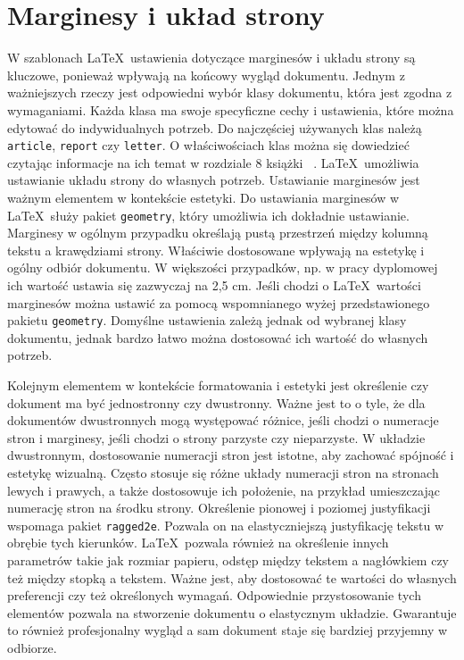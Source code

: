 
\section{Marginesy i układ strony }\label{sec:klassa}
W szablonach \LaTeX\ ustawienia dotyczące marginesów i układu strony są kluczowe, ponieważ wpływają na końcowy wygląd dokumentu. Jednym z ważniejszych rzeczy jest odpowiedni wybór klasy dokumentu, która jest zgodna z wymaganiami. Każda klasa ma swoje specyficzne cechy i ustawienia, które można edytować do indywidualnych potrzeb. Do najczęściej używanych klas należą \texttt{article}, \texttt{report} czy \texttt{letter}. O właściwościach klas można się dowiedzieć czytając informacje na ich temat w rozdziale 8 książki ~\cite{diller2001latex}. \LaTeX\ umożliwia ustawianie układu strony do własnych potrzeb. Ustawianie marginesów jest ważnym elementem w kontekście estetyki. Do ustawiania marginesów w \LaTeX\ służy pakiet \texttt{geometry}, który umożliwia ich dokładnie ustawianie. Marginesy w ogólnym przypadku określają pustą przestrzeń między kolumną tekstu a krawędziami strony. Właściwie dostosowane wpływają na estetykę i ogólny odbiór dokumentu. W większości przypadków, np. w pracy dyplomowej ich wartość ustawia się zazwyczaj na 2,5 cm. Jeśli chodzi o \LaTeX\ wartości marginesów można ustawić za pomocą wspomnianego wyżej przedstawionego pakietu \texttt{geometry}. Domyślne ustawienia zależą jednak od wybranej klasy dokumentu, jednak bardzo łatwo można dostosować ich wartość do własnych potrzeb. 

Kolejnym elementem w kontekście formatowania i estetyki jest określenie czy dokument ma być jednostronny czy dwustronny. Ważne jest to o tyle, że dla dokumentów dwustronnych mogą występować różnice, jeśli chodzi o numeracje stron i marginesy, jeśli chodzi o strony parzyste czy nieparzyste. W układzie dwustronnym, dostosowanie numeracji stron jest istotne, aby zachować spójność i estetykę wizualną. Często stosuje się różne układy numeracji stron na stronach lewych i prawych, a także dostosowuje ich położenie, na przykład umieszczając numerację stron na środku strony. Określenie pionowej i poziomej justyfikacji wspomaga pakiet \texttt{ragged2e}. Pozwala on na elastyczniejszą justyfikację tekstu w obrębie tych kierunków. \LaTeX\ pozwala również na określenie innych parametrów takie jak rozmiar papieru, odstęp między tekstem a nagłówkiem czy też między stopką a tekstem. Ważne jest, aby dostosować te wartości do własnych preferencji czy też określonych wymagań. Odpowiednie przystosowanie tych elementów pozwala na stworzenie dokumentu o elastycznym układzie. Gwarantuje to również profesjonalny wygląd a sam dokument staje się bardziej przyjemny w odbiorze.  

